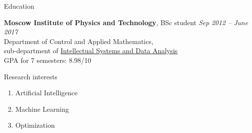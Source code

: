 \documentclass{resume} %
\begin{document}

\begin{rSection}{Education}

{\bf Moscow Institute of Physics and Technology}, BSc student \hfill {\em Sep 2012 -- June 2017} \\ 
Department of Control and Applied Mathematics,\\sub-department of \href{http://www.machinelearning.ru/}{Intellectual Systems and Data Analysis}\\
GPA for 7 semesters: 8.98/10

\end{rSection}


\begin{rSection}{Research interests}
\begin{enumerate}
\item Artificial Intelligence
\item Machine Learning
\item Optimization
\end{enumerate}
\end{rSection}
\end{document}
